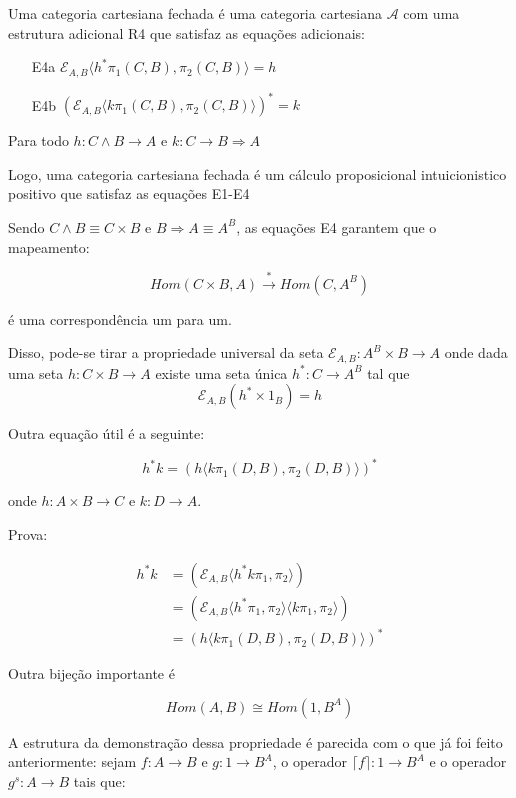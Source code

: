 \documentclass[../main.tex]{subfiles}
\begin{document}
\begin{definition}
    Uma categoria cartesiana fechada é uma categoria cartesiana $\mathcal{A}$ com uma estrutura adicional R4 que satisfaz as equações adicionais:
    \begin{enumerate}
        \item[E4a] $\mathcal{E}_{A, B} \langle h^{\ast} \pi_1(C, B), \pi_2(C, B) \rangle = h$
        \item[E4b] $(\mathcal{E}_{A, B} \langle k \pi_1(C, B), \pi_2(C, B) \rangle)^{\ast} = k$
    \end{enumerate}
    Para todo $h : C \land B \to A$ e $k : C \to B \Rightarrow A$
\end{definition}

Logo, uma categoria cartesiana fechada é um cálculo proposicional intuicionistico positivo que satisfaz as equações E1-E4

Sendo $C \land B \equiv C \times B$ e $B \Rightarrow A \equiv A^B$, as equações E4 garantem que o mapeamento:

$$Hom(C \times B, A) \xrightarrow{\ast} Hom(C, A^B)$$

é uma correspondência um para um.

Disso, pode-se tirar a propriedade universal da seta $\mathcal{E}_{A, B} : A^B \times B \to A$ onde dada uma seta $h : C \times B \to A$ existe uma seta única $h^{\ast} : C \to A^B$ tal que $$\mathcal{E}_{A, B}(h^{\ast} \times 1_B) = h$$

Outra equação útil é a seguinte:

$$h^{\ast} k = (h \langle k \pi_1(D, B), \pi_2(D, B) \rangle)^{\ast}$$

onde $h : A \times B \to C$ e $k : D \to A$.

Prova:

\begin{align*}
    h^{\ast} k & = (\mathcal{E}_{A, B} \langle h^{\ast} k \pi_1, \pi_2 \rangle) \\
               & = (\mathcal{E}_{A, B} \langle h^{\ast} \pi_1, \pi_2 \rangle \langle k \pi_1, \pi_2 \rangle) \\
               & = (h \langle k \pi_1(D, B), \pi_2(D, B) \rangle)^{\ast}
\end{align*}

Outra bijeção importante é 

$$Hom(A, B) \cong Hom(1, B^A)$$

A estrutura da demonstração dessa propriedade é parecida com o que já foi feito anteriormente: sejam $f : A \to B$ e $g : 1 \to B^A$, o operador $\lceil f \rceil : 1 \to B^A$ e o operador $g^s : A \to B$ tais que:
\end{document}
